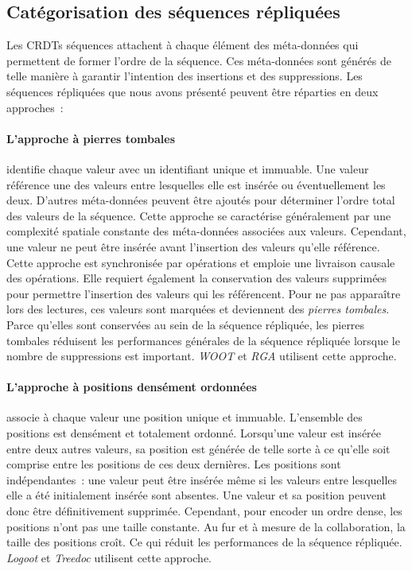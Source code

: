 

\subsection{Catégorisation des séquences répliquées}

Les \acp{CRDT} séquences attachent à chaque élément des méta-données qui permettent de former l'ordre de la séquence.
Ces méta-données sont générés de telle manière à garantir l'intention des insertions et des suppressions.
Les séquences répliquées que nous avons présenté peuvent être réparties en deux approches~:

\paragraph{L'approche à pierres tombales}\autocite{oster_2006_woot, roh_2011_rga} identifie chaque valeur avec un identifiant unique et immuable.
Une valeur référence une des valeurs entre lesquelles elle est insérée ou éventuellement les deux.
D'autres méta-données peuvent être ajoutés pour déterminer l'ordre total des valeurs de la séquence.
Cette approche se caractérise généralement par une complexité spatiale constante des méta-données associées aux valeurs.
Cependant, une valeur ne peut être insérée avant l'insertion des valeurs qu'elle référence.
Cette approche est synchronisée par opérations et emploie une livraison causale des opérations.
Elle requiert également la conservation des valeurs supprimées pour permettre l'insertion des valeurs qui les référencent.
Pour ne pas apparaître lors des lectures, ces valeurs sont marquées et deviennent des \emph{pierres tombales}.
Parce qu'elles sont conservées au sein de la séquence répliquée, les pierres tombales réduisent les performances générales de la séquence répliquée lorsque le nombre de suppressions est important.
\emph{WOOT} et \emph{RGA} utilisent cette approche.

\paragraph{L'approche à positions densément ordonnées}\autocite{weiss_2009_logoot, preguica_2009_treedoc, nedelec_2013_lseq} associe à chaque valeur une position unique et immuable.
L'ensemble des positions est densément et totalement ordonné.
Lorsqu'une valeur est insérée entre deux autres valeurs, sa position est générée de telle sorte à ce qu'elle soit comprise entre les positions de ces deux dernières.
Les positions sont indépendantes~: une valeur peut être insérée même si les valeurs entre lesquelles elle a été initialement insérée sont absentes.
Une valeur et sa position peuvent donc être définitivement supprimée.
Cependant, pour encoder un ordre dense, les positions n'ont pas une taille constante.
Au fur et à mesure de la collaboration, la taille des positions croît.
Ce qui réduit les performances de la séquence répliquée.
\emph{Logoot} et \emph{Treedoc} utilisent cette approche.

